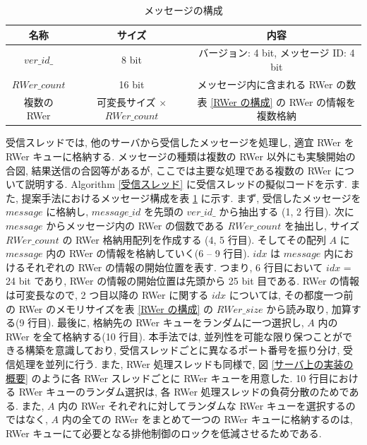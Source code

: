 \begin{table}[t!]
    \caption{メッセージの構成}
    \label{メッセージの構成}
    \centering
    \begin{tabular}{ccc}
        \hline
        名称  &  サイズ  &  内容 \\
        \hline \hline
        $ver\_id\_$  &  8 bit  &  バージョン: 4 bit, メッセージ ID: 4 bit \\
        \hline
        $RWer\_count$  &  16 bit  &  メッセージ内に含まれる RWer の数 \\
        \hline
        複数の RWer  &  可変長サイズ $\times$ $RWer\_count$  &  表 \ref{RWer の構成} の RWer の情報を複数格納 \\
        \hline
    \end{tabular}
\end{table}

受信スレッドでは, 他のサーバから受信したメッセージを処理し, 適宜 RWer を RWer キューに格納する. メッセージの種類は複数の RWer 以外にも実験開始の合図, 結果送信の合図等があるが, ここでは主要な処理である複数の RWer について説明する. Algorithm \ref{受信スレッド} に受信スレッドの擬似コードを示す. また, 提案手法におけるメッセージ構成を表 \ref{メッセージの構成} に示す. まず, 受信したメッセージを $message$ に格納し, $message\_id$ を先頭の $ver\_id\_$ から抽出する (1, 2 行目). 次に $message$ からメッセージ内の RWer の個数である $RWer\_count$ を抽出し, サイズ $RWer\_count$ の RWer 格納用配列を作成する (4, 5 行目). そしてその配列 $A$ に $message$ 内の RWer の情報を格納していく(6 -- 9 行目). $idx$ は $message$ 内におけるそれぞれの RWer の情報の開始位置を表す. つまり, 6 行目において $idx$ = 24 bit であり, RWer の情報の開始位置は先頭から 25 bit 目である. RWer の情報は可変長なので, 2 つ目以降の RWer に関する $idx$ については, その都度一つ前の RWer のメモリサイズを表 \ref{RWer の構成} の $RWer\_size$ から読み取り, 加算する(9 行目). 最後に, 格納先の RWer キューをランダムに一つ選択し, $A$ 内の RWer を全て格納する(10 行目). 本手法では, 並列性を可能な限り保つことができる構築を意識しており, 受信スレッドごとに異なるポート番号を振り分け, 受信処理を並列に行う. また, RWer 処理スレッドも同様で, 図 \ref{サーバ上の実装の概要} のように各 RWer スレッドごとに RWer キューを用意した. 10 行目における RWer キューのランダム選択は, 各 RWer 処理スレッドの負荷分散のためである. また, $A$ 内の RWer それぞれに対してランダムな RWer キューを選択するのではなく, $A$ 内の全ての RWer をまとめて一つの RWer キューに格納するのは, RWer キューにて必要となる排他制御のロックを低減させるためである. 

